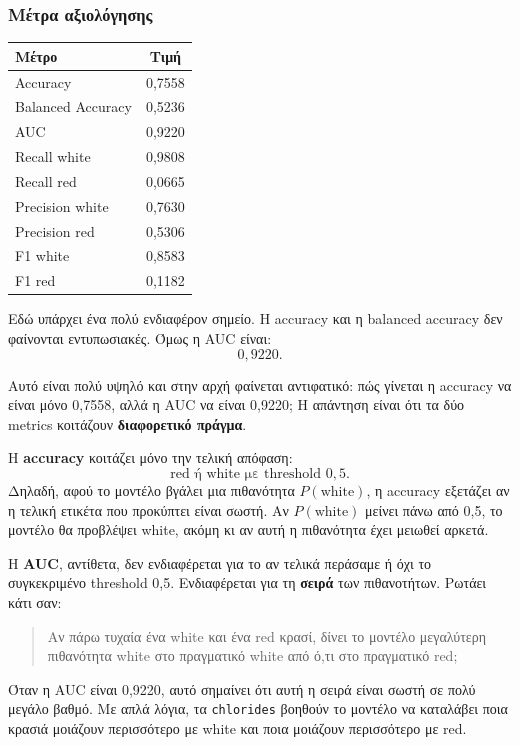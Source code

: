 \documentclass[11pt,a4paper]{article}
\newcommand{\code}[1]{\texttt{#1}}
\begin{document}
\subsubsection{Μέτρα αξιολόγησης}

\begin{center}
\begin{tabular}{lc}
\toprule
Μέτρο & Τιμή \\
\midrule
Accuracy & 0,7558 \\
Balanced Accuracy & 0,5236 \\
AUC & 0,9220 \\
Recall white & 0,9808 \\
Recall red & 0,0665 \\
Precision white & 0,7630 \\
Precision red & 0,5306 \\
F1 white & 0,8583 \\
F1 red & 0,1182 \\
\bottomrule
\end{tabular}
\end{center}

Εδώ υπάρχει ένα πολύ ενδιαφέρον σημείο. Η accuracy και η balanced accuracy
δεν φαίνονται εντυπωσιακές. Όμως η AUC είναι:
\[
0{,}9220.
\]

Αυτό είναι πολύ υψηλό και στην αρχή φαίνεται αντιφατικό: πώς γίνεται η
accuracy να είναι μόνο 0,7558, αλλά η AUC να είναι 0,9220; Η απάντηση είναι
ότι τα δύο metrics κοιτάζουν \textbf{διαφορετικό πράγμα}.

Η \textbf{accuracy} κοιτάζει μόνο την τελική απόφαση:
\[
\text{red ή white με threshold } 0{,}5.
\]
Δηλαδή, αφού το μοντέλο βγάλει μια πιθανότητα \(P(\text{white})\), η
accuracy εξετάζει αν η τελική ετικέτα που προκύπτει είναι σωστή. Αν
\(P(\text{white})\) μείνει πάνω από 0,5, το μοντέλο θα προβλέψει white,
ακόμη κι αν αυτή η πιθανότητα έχει μειωθεί αρκετά.

Η \textbf{AUC}, αντίθετα, δεν ενδιαφέρεται για το αν τελικά περάσαμε ή όχι
το συγκεκριμένο threshold 0,5. Ενδιαφέρεται για τη \textbf{σειρά} των
πιθανοτήτων. Ρωτάει κάτι σαν:
\begin{quote}
Αν πάρω τυχαία ένα white και ένα red κρασί, δίνει το μοντέλο μεγαλύτερη
πιθανότητα white στο πραγματικό white από ό,τι στο πραγματικό red;
\end{quote}

Όταν η AUC είναι 0,9220, αυτό σημαίνει ότι αυτή η σειρά είναι σωστή σε πολύ
μεγάλο βαθμό. Με απλά λόγια, τα \code{chlorides} βοηθούν το μοντέλο να
καταλάβει ποια κρασιά μοιάζουν περισσότερο με white και ποια μοιάζουν
περισσότερο με red.
\end{document}

